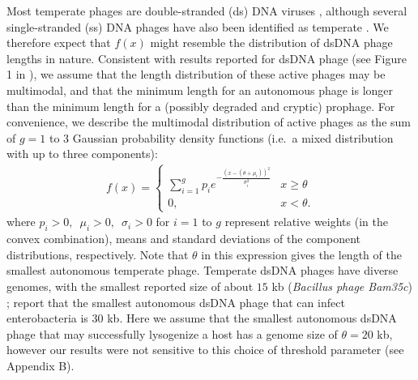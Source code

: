 Most temperate phages are double-stranded (ds) DNA viruses \citep{szekely_single-stranded_2016}, although several single-stranded (ss) DNA phages have also been identified  as temperate \citep{krupovic_single-stranded_2015}.  We therefore expect that $f(x)$ might resemble the distribution of dsDNA phage lengths in nature.  Consistent with results reported for dsDNA phage (see Figure 1 in \cite{bobay_pervasive_2014}), we assume that the length distribution of these active phages may be multimodal, and that the minimum length for an autonomous phage is longer than the minimum length for a (possibly degraded and cryptic) prophage.  For convenience, we describe the multimodal distribution of active phages as the sum of $g =1$ to $3$ Gaussian probability density functions (i.e.\ a mixed distribution with up to three components):
\begin{eqnarray}\label{gs}
f(x) = \begin{cases} 
\sum_{i=1}^g {p_{i}e^{-\frac{(x-(\theta+\mu_{i}))^{2}}{\sigma_{i}^{2}}}} & x \geq \theta \\
0,  & x < \theta.
\end{cases}
\end{eqnarray}
where $p_{i} >0, \, \, \, \mu_{i} >0, \,\,\, \sigma_{i}>0$ for $i= 1$ to $g$ represent relative weights (in the convex combination), means and standard deviations of the component distributions, respectively. Note that $\theta$ in this expression gives the length of the smallest autonomous temperate phage. 
Temperate dsDNA phages have diverse genomes, with the smallest reported size of about $15$ kb (\textit{Bacillus phage Bam35c}) \citep{ravantti_comparative_2003, gaidelyte_linear_2005}; \cite{bobay_pervasive_2014} report that the smallest autonomous dsDNA phage that can infect enterobacteria is $30$ kb.  Here we assume that the smallest autonomous dsDNA phage that may successfully lysogenize a host has a genome size of $\theta = 20$ kb, however our results were not sensitive to this choice of threshold parameter (see Appendix B).

